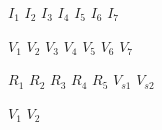 \documentclass[11pt]{article}
\begin{document}
$I_1$
$I_2$
$I_3$
$I_4$
$I_5$
$I_6$
$I_7$

	

$V_1$
$V_2$
$V_3$
$V_4$
$V_5$
$V_6$
$V_7$

$R_1$	
$R_2$
$R_3$
$R_4$
$R_5$
$V_{s1}$
$V_{s2}$

$V_{1}$
$V_{2}$
\end{document}
